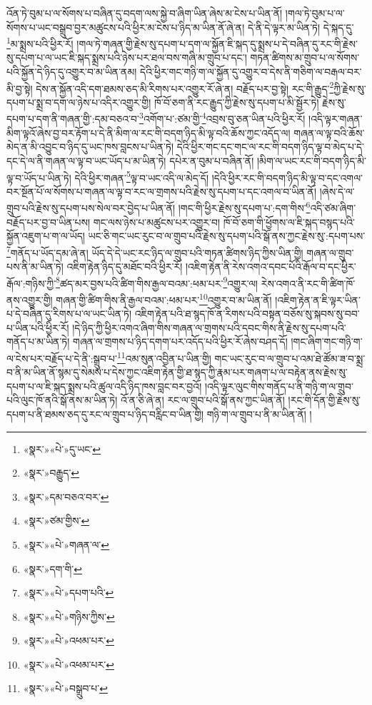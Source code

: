 འོན་ཏེ་བུམ་པ་ལ་སོགས་པ་བཞིན་དུ་བདག་ལས་སྐྱེ་བ་ཞིག་ཡིན་ཞེས་མ་ངེས་པ་ཡིན་ནོ། །གལ་ཏེ་བུམ་པ་ལ་སོགས་པ་ཡང་བསྒྲུབ་བྱར་མཚུངས་པའི་ཕྱིར་མ་ངེས་པ་ཉིད་མ་ཡིན་ནོ་ཞེ་ན། དེ་ནི་དེ་ལྟར་མ་ཡིན་ཏེ། དེ་སྐད་དུ་\footnote{«སྣར་»«པེ་»དུ་ཡང་}མ་སྨྲས་པའི་ཕྱིར་རོ། །གལ་ཏེ་གཞན་གྱི་རྗེས་སུ་དཔག་པ་དག་ལ་སྐྱོན་ཇི་སྐད་དུ་སྨྲས་པ་དེ་བཞིན་དུ་རང་གི་རྗེས་སུ་དཔག་པ་ལ་ཡང་ཇི་སྐད་སྨྲས་པའི་ཉེས་པར་ཐལ་བས་གཞི་མ་གྲུབ་པ་དང་། གཏན་ཚིགས་མ་གྲུབ་པ་ལ་སོགས་པའི་སྐྱོན་དེ་ཉིད་དུ་འགྱུར་བ་མ་ཡིན་ནམ། དེའི་ཕྱིར་གང་གཉི་ག་ལ་སྐྱོན་དུ་འགྱུར་བ་དེས་ནི་གཅིག་ལ་བརྒལ་བར་མི་བྱ་སྟེ། དེས་ན་སྐྱོན་འདི་དག་ཐམས་ཅད་མི་རིགས་པར་འགྱུར་རོ་ཞེ་ན། བརྗོད་པར་བྱ་སྟེ། རང་གི་རྒྱུད་\footnote{«སྣར་»བརྒྱུད་}ཀྱི་རྗེས་སུ་དཔག་པ་སྨྲ་བ་དག་ལ་ཉེས་པ་འདིར་འགྱུར་གྱི། ཁོ་བོ་ཅག་ནི་རང་རྒྱུད་ཀྱི་རྗེས་སུ་དཔག་པ་མི་སྦྱོར་ཏེ། རྗེས་སུ་དཔག་པ་དག་ནི་གཞན་གྱི་:དམ་བཅའ་བ་\footnote{«སྣར་»དམ་བཅའ་བར་}འགོག་པ་:ཙམ་གྱི་\footnote{«སྣར་»ཙམ་གྱིས་}འབྲས་བུ་ཅན་ཡིན་པའི་ཕྱིར་རོ། །འདི་ལྟར་གཞན་མིག་ལྟའོ་ཞེས་བྱ་བར་རྟོག་པ་དེ་ནི་མིག་ལ་རང་གི་བདག་ཉིད་མི་ལྟ་བའི་ཆོས་ཀྱང་འདོད་ལ། གཞན་ལ་ལྟ་བའི་ཆོས་མེད་ན་མི་འབྱུང་བ་ཉིད་དུ་ཡང་ཁས་བླངས་པ་ཡིན་ཏེ། དེའི་ཕྱིར་གང་དང་གང་ལ་རང་གི་བདག་ཉིད་ལྟ་བ་མེད་པ་དེ་དང་དེ་ལ་ནི་གཞན་ལ་ལྟ་བ་ཡང་ཡོད་པ་མ་ཡིན་ཏེ། དཔེར་ན་བུམ་པ་བཞིན་ནོ། །མིག་ལ་ཡང་རང་གི་བདག་ཉིད་མི་ལྟ་བ་ཡོད་པ་ཡིན་ཏེ། དེའི་ཕྱིར་གཞན་\footnote{«སྣར་»«པེ་»གཞན་ལ་}ལྟ་བ་ཡང་འདི་ལ་མེད་དོ། །དེའི་ཕྱིར་རང་གི་བདག་ཉིད་མི་ལྟ་བ་དང་འགལ་བར་སྔོན་པོ་ལ་སོགས་པ་གཞན་ལ་ལྟ་བ་རང་ལ་གྲགས་པའི་རྗེས་སུ་དཔག་པ་དང་འགལ་བ་ཡིན་ནོ། །ཞེས་དེ་ལ་གྲུབ་པའི་རྗེས་སུ་དཔག་པས་སེལ་བར་བྱེད་པ་ཡིན་ནོ། །གང་གི་ཕྱིར་རྗེས་སུ་དཔག་པ་:དག་གིས་\footnote{«སྣར་»དག་གི་}འདི་ཙམ་ཞིག་བརྗོད་པར་བྱ་བ་ཡིན་པས། གང་ལས་ཉེས་པ་མཚུངས་པར་འགྱུར་བ། ཁོ་བོ་ཅག་གི་ཕྱོགས་ལ་ཇི་སྐད་བསྙད་པའི་སྐྱོན་འཇུག་པ་ག་ལ་ཡོད། ཡང་ཅི་གང་ཡང་རུང་བ་ལ་གྲུབ་པའི་རྗེས་སུ་དཔག་པའི་སྒོ་ནས་ཀྱང་རྗེས་སུ་:དཔག་པས་\footnote{«སྣར་»«པེ་»དཔག་པའི་}གནོད་པ་ཡོད་དམ་ཞེ་ན། ཡོད་དེ་དེ་ཡང་རང་ཉིད་ལ་གྲུབ་པའི་གཏན་ཚིགས་ཉིད་ཀྱིས་ཡིན་གྱི། གཞན་ལ་གྲུབ་པས་ནི་མ་ཡིན་ཏེ། འཇིག་རྟེན་ཉིད་དུ་མཐོང་བའི་ཕྱིར་རོ། །འཇིག་རྟེན་ནི་རེས་འགའ་དབང་པོའི་རྒོལ་བ་དང་ཕྱིར་རྒོལ་:གཉིས་ཀྱི་\footnote{«སྣར་»«པེ་»གཉིས་ཀྱིས་}ཚད་མར་བྱས་པའི་ཚིག་གིས་རྒྱལ་བའམ་:ཕམ་པར་\footnote{«སྣར་»«པེ་»འཕམ་པར་}འགྱུར་ལ། རེས་འགའ་ནི་རང་གི་ཚིག་ཁོ་ནས་འགྱུར་གྱི། གཞན་གྱི་ཚིག་གིས་ནི་རྒྱལ་བའམ་:ཕམ་པར་\footnote{«སྣར་»«པེ་»འཕམ་པར་}འགྱུར་བ་མ་ཡིན་ནོ། །འཇིག་རྟེན་ན་ཇི་ལྟར་ཡིན་པ་དེ་བཞིན་དུ་རིགས་པ་ལ་ཡང་ཡིན་ཏེ། འཇིག་རྟེན་པའི་ཐ་སྙད་ཁོ་ན་རིགས་པའི་བསྟན་བཅོས་སུ་སྐབས་སུ་བབ་པ་ཡིན་པའི་ཕྱིར་རོ། །དེ་ཉིད་ཀྱི་ཕྱིར་འགའ་ཞིག་གིས་གཞན་ལ་གྲགས་པའི་དབང་གིས་ནི་རྗེས་སུ་དཔག་པའི་གནོད་པ་མ་ཡིན་ཏེ། གཞན་ལ་གྲགས་པ་ཉིད་དགག་པར་འདོད་པའི་ཕྱིར་རོ་ཞེས་བཤད་དོ། །གང་ཞིག་གང་གཉི་ག་ལ་ངེས་པར་བརྗོད་པ་དེ་ནི་:སྒྲུབ་པ་\footnote{«སྣར་»«པེ་»བསྒྲུབ་པ་}འམ་སུན་འབྱིན་པ་ཡིན་གྱི། གང་ཡང་རུང་བ་ལ་གྲུབ་པ་འམ་ཐེ་ཚོམ་ཟ་བ་སྨྲ་བ་ནི་མ་ཡིན་ནོ་སྙམ་དུ་སེམས་པ་དེས་ཀྱང་འཇིག་རྟེན་གྱི་ཐ་སྙད་ཀྱི་རྣམ་པར་གཞག་པ་ལ་བརྟེན་ནས་རྗེས་སུ་དཔག་པ་ལ་ཇི་སྐད་སྨྲས་པའི་ཚུལ་འདི་ཉིད་ཁས་བླང་བར་བྱའོ། །འདི་ལྟར་ལུང་གིས་གནོད་པ་ནི་གཉི་ག་ལ་གྲུབ་པའི་ལུང་ཁོ་ནའི་སྒོ་ནས་མ་ཡིན་ཏེ། འོ་ན་ཅི་ཞེ་ན། རང་ལ་གྲུབ་པའི་སྒོ་ནས་ཀྱང་ཡིན་ནོ། །རང་གི་དོན་གྱི་རྗེས་སུ་དཔག་པ་ནི་ཐམས་ཅད་དུ་རང་ལ་གྲུབ་པ་ཉིད་བརླིང་བ་ཡིན་གྱི། གཉི་ག་ལ་གྲུབ་པ་ནི་མ་ཡིན་ནོ། །
